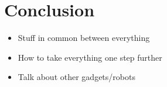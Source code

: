 \newpage
\section{Conclusion}
\begin{itemize}
  \item Stuff in common between everything
  \item How to take everything one step further
  \item Talk about other gadgets/robots
\end{itemize}
